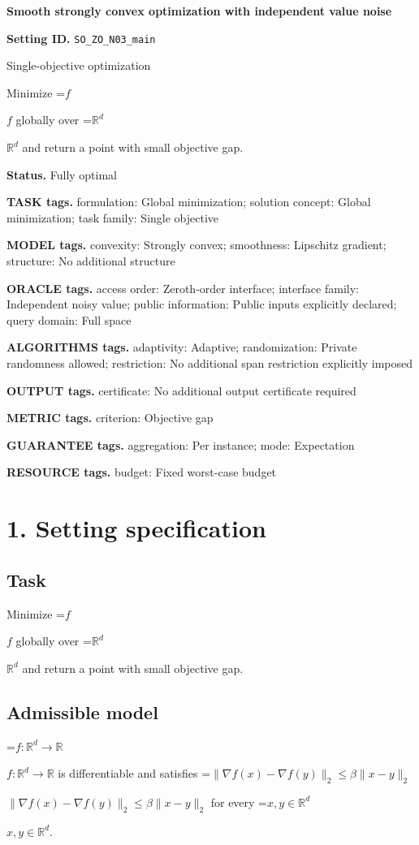 \documentclass[10pt,a4paper]{article}
\newcommand{\AtlasMath}[1]{\par\begingroup\centering\setbox0=\hbox{$\displaystyle #1$}\ifdim\wd0>1.4\linewidth\typeout{ATLAS WIDE FORMULA: \the\wd0}\fi\ifdim\wd0>\linewidth\resizebox{\linewidth}{!}{\box0}\else\box0\fi\par\endgroup}
\newcommand{\AtlasInlineMath}[1]{\begingroup\setbox0=\hbox{$#1$}\ifdim\wd0>.4\linewidth\endgroup\AtlasMath{#1}\else\endgroup$#1$\fi}
\begin{document}
\raggedright

{\LARGE\bfseries\sffamily\color{AtlasNavy} Smooth strongly convex optimization with independent value noise\par}\vspace{5pt}
\textbf{Setting ID.} \texttt{SO\_\allowbreak{}ZO\_\allowbreak{}N03\_\allowbreak{}main}

Single-objective optimization

Minimize \AtlasInlineMath{f} globally over \AtlasInlineMath{\mathbb{R}^d} and return a point with small objective gap.

\textbf{Status.} Fully optimal

\textbf{TASK tags.} formulation: Global minimization; solution concept: Global minimization; task family: Single objective

\textbf{MODEL tags.} convexity: Strongly convex; smoothness: Lipschitz gradient; structure: No additional structure

\textbf{ORACLE tags.} access order: Zeroth-order interface; interface family: Independent noisy value; public information: Public inputs explicitly declared; query domain: Full space

\textbf{ALGORITHMS tags.} adaptivity: Adaptive; randomization: Private randomness allowed; restriction: No additional span restriction explicitly imposed

\textbf{OUTPUT tags.} certificate: No additional output certificate required

\textbf{METRIC tags.} criterion: Objective gap

\textbf{GUARANTEE tags.} aggregation: Per instance; mode: Expectation

\textbf{RESOURCE tags.} budget: Fixed worst-case budget

\section{1. Setting specification}
\subsection{Task}
Minimize \AtlasInlineMath{f} globally over \AtlasInlineMath{\mathbb{R}^d} and return a point with small objective gap.

\subsection{Admissible model}
\AtlasInlineMath{f:\mathbb{R}^d\to\mathbb{R}} is differentiable and satisfies \AtlasInlineMath{\|\nabla f(x)-\nabla f(y)\|_2\le\beta\|x-y\|_2} for every \AtlasInlineMath{x,y\in\mathbb{R}^d}.
\end{document}
